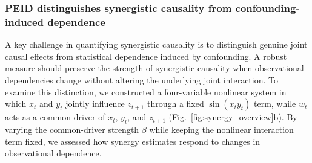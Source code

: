 \documentclass[fleqn,10pt]{wlscirep}
\theoremstyle{naturetheorem}
\begin{document}
\subsubsection*{PEID distinguishes synergistic causality from confounding-induced dependence}

A key challenge in quantifying synergistic causality is to distinguish genuine joint causal effects from statistical dependence induced by confounding. A robust measure should preserve the strength of synergistic causality when observational dependencies change without altering the underlying joint interaction. To examine this distinction, we constructed a four-variable nonlinear system in which $x_t$ and $y_t$ jointly influence $z_{t+1}$ through a fixed $\sin(x_t y_t)$ term, while $w_t$ acts as a common driver of $x_t$, $y_t$, and $z_{t+1}$ (Fig.~\ref{fig:synergy_overview}b). By varying the common-driver strength $\beta$ while keeping the nonlinear interaction term fixed, we assessed how synergy estimates respond to changes in observational dependence.

\end{document}
